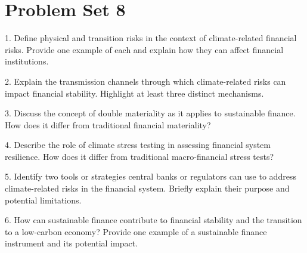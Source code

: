 \newpage

\section{Problem Set 8}

1. Define physical and transition risks in the context of climate-related financial
risks. Provide one example of each and explain how they can affect financial
institutions.

2. Explain the transmission channels through which climate-related risks can
impact financial stability. Highlight at least three distinct mechanisms.

3. Discuss the concept of double materiality as it applies to sustainable finance.
How does it differ from traditional financial materiality?

4. Describe the role of climate stress testing in assessing financial system
resilience. How does it differ from traditional macro-financial stress tests?

5. Identify two tools or strategies central banks or regulators can use to address
climate-related risks in the financial system. Briefly explain their purpose and
potential limitations.

6. How can sustainable finance contribute to financial stability and the transition
to a low-carbon economy? Provide one example of a sustainable finance
instrument and its potential impact.
